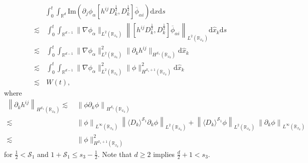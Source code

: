 \documentclass[10pt,twoside,a4paper]{article}
\numberwithin{equation}{section}\allowdisplaybreaks
\def\leq{\leqslant}
\def\geq{\geqslant}
\begin{document}
\begin{align} \label{ccons3_c2}
	&\int_0^t \int_{\mathbb{R}^d}  \mathrm{Im} \left(   \partial_j \phi_{\alpha } \left[ h^{ij}  D_k^{\frac12}, D_k^{\frac12} \right] \overline{\phi}_{\alpha i }\right)\mathrm{d} x \mathrm{d} s\nonumber\\
	\lesssim &\,\int_0^t \int_{\mathbb{R}^{d-1}} \|\nabla\phi_{\alpha}\|_{L^{2}(\mathbb{R}_{x_k})}  \left\| \left[ h^{ij}  D_k^{\frac12}, D_k^{\frac12} \right] \overline{\phi}_{\alpha i }\right\|_{L^2(\mathbb{R}_{x_k})} \mathrm{d} \hat{x}_k \mathrm{d} s\\
	\lesssim &\,\int_0^t \int_{\mathbb{R}^{d-1}} \|\nabla\phi_{\alpha}\|_{L^{2}(\mathbb{R}_{x_k})}^2   \|\partial_k h^{ij}\|_{H^{ \mathscr{S}_1}(\mathbb{R}_{x_k})} \mathrm{d} \hat{x}_k\nonumber\\
	\lesssim &\,\int_0^t \int_{\mathbb{R}^{d-1}} \|\nabla\phi_{\alpha}\|_{L^{2}(\mathbb{R}_{x_k})}^2    \|\phi\|_{H^{ \mathscr{S}_1+1}(\mathbb{R}_{x_k})}^2 \mathrm{d} \hat{x}_k\nonumber\\
	\lesssim &\,W (t), \nonumber
\end{align}
where
\begin{align*}
	\left\|\partial_k h^{ij}\right\|_{H^{ \mathscr{S}_1}(\mathbb{R}_{x_k})}\lesssim &\, \left\|\phi\partial_k \phi\right\|_{H^{ \mathscr{S}_1}(\mathbb{R}_{x_k})}\\
	\lesssim &\,\left\|\phi \right\|_{L^\infty(\mathbb{R}_{x_k})} \ \left\|\langle D_k\rangle^{\mathscr{S}_1}\partial_k \phi\right\|_{L^{2 }(\mathbb{R}_{x_k})}+\left\|\langle D_k\rangle^{\mathscr{S}_1}\phi \right\|_{L^2(\mathbb{R}_{x_k})} \ \left\|\partial_k \phi\right\|_{L^{\infty }(\mathbb{R}_{x_k})}\\
	\lesssim &\, \|\phi\|_{H^{ \mathscr{S}_1+1}(\mathbb{R}_{x_k})}^2
\end{align*}
for $  \frac{1}{2}<\mathscr{S}_1$  and $ 1+\mathscr{S}_1\leq s_3-\frac 12 $.   Note that $ d\geq 2 $ implies $ \frac{d}{2}+1<s_3 $. 
\end{document}
